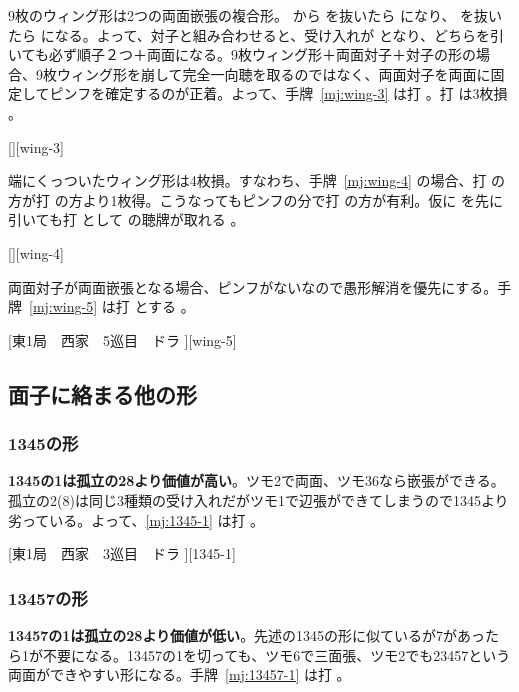 \documentclass[../nankiru_main.tex]{subfiles}
\begin{document}
9枚のウィング形は2つの両面嵌張の複合形。 から  を抜いたら  になり、 を抜いたら  になる。よって、対子と組み合わせると、受け入れが  となり、どちらを引いても必ず順子２つ＋両面になる。9枚ウィング形＋両面対子＋対子の形の場合、9枚ウィング形を崩して完全一向聴を取るのではなく、両面対子を両面に固定してピンフを確定するのが正着。よって、手牌~\ref{mj:wing-3} は打 。打  は3枚損 \citep[][p.~138]{uzaku-haikouritsu}。

[][wing-3]

端にくっついたウィング形は4枚損。すなわち、手牌~\ref{mj:wing-4} の場合、打  の方が打  の方より1枚得。こうなってもピンフの分で打  の方が有利。仮に  を先に引いても打  として  の聴牌が取れる \citep[][p.~138]{uzaku-haikouritsu}。

[][wing-4]

両面対子が両面嵌張となる場合、ピンフがないなので愚形解消を優先にする。手牌~\ref{mj:wing-5} は打  とする \citep{yuusee-9wing}。

[東1局　西家　5巡目　ドラ ][wing-5]


\subsection{面子に絡まる他の形}

\subsubsection{1345の形}

\textbf{1345の1は孤立の28より価値が高い}\citep{ittaku}。ツモ2で両面、ツモ36なら嵌張ができる。孤立の2(8)は同じ3種類の受け入れだがツモ1で辺張ができてしまうので1345より劣っている。よって、\ref{mj:1345-1} は打 。

[東1局　西家　3巡目　ドラ ][1345-1]


\subsubsection{13457の形}

\textbf{13457の1は孤立の28より価値が低い}\citep{ittaku}。先述の1345の形に似ているが7があったら1が不要になる。13457の1を切っても、ツモ6で三面張、ツモ2でも23457という両面ができやすい形になる。手牌~\ref{mj:13457-1} は打 。
\end{document}
